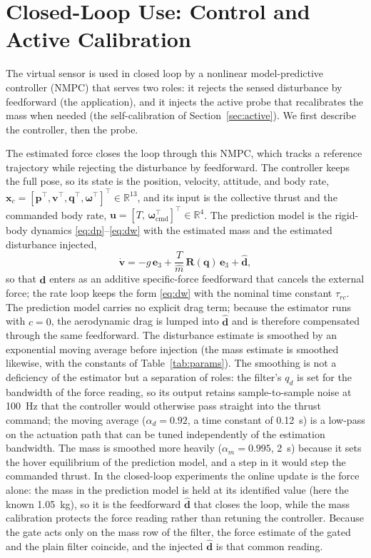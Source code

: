 \documentclass{ieeeaccess}
\newcommand{\R}{\mathbb{R}}
\newcommand{\vect}[1]{\bm{#1}}
\newcommand{\mat}[1]{\mathbf{#1}}
\begin{document}
\section{Closed-Loop Use: Control and Active Calibration}\label{sec:nmpc}

The virtual sensor is used in closed loop by a nonlinear model-predictive
controller (NMPC) that serves two roles: it rejects the sensed disturbance by
feedforward (the application), and it injects the active probe that recalibrates
the mass when needed (the self-calibration of Section~\ref{sec:active}). We first
describe the controller, then the probe.

The estimated force closes the loop through this NMPC, which
tracks a reference trajectory while rejecting the
disturbance by feedforward. The controller keeps the full pose, so its state is
the position, velocity, attitude, and body rate,
$\vect{x}_c=[\vect{p}^{\!\top},\vect{v}^{\!\top},\vect{q}^{\!\top},\vect{\omega}^{\!\top}]^{\!\top}\in\R^{13}$,
and its input is the collective thrust and the commanded body rate,
$\vect{u}=[T,\,\vect{\omega}_{\text{cmd}}^{\!\top}]^{\!\top}\in\R^{4}$. The
prediction model is the rigid-body dynamics
\eqref{eq:dp}--\eqref{eq:dw} with the estimated mass and the estimated
disturbance injected,
\begin{equation}
\dot{\vect{v}} = -g\,\vect{e}_3 + \frac{T}{\hat{m}}\,\mat{R}(\vect{q})\,\vect{e}_3
                  + \hat{\vect{d}},
\label{eq:nmpc-dyn}
\end{equation}
so that $\hat{\vect{d}}$ enters as an additive specific-force feedforward that
cancels the external force; the rate loop keeps the form \eqref{eq:dw} with the
nominal time constant $\tau_{rc}$. The prediction model carries no explicit drag term; because the
estimator runs with $c=0$, the aerodynamic drag is lumped into $\hat{\vect{d}}$
and is therefore compensated through the same feedforward. The disturbance
estimate is smoothed by an exponential moving average before injection (the mass
estimate is smoothed likewise, with the constants of Table~\ref{tab:params}).
The smoothing is not a deficiency of the estimator but a separation of roles:
the filter's $q_d$ is set for the bandwidth of the force reading, so its output
retains sample-to-sample noise at \SI{100}{\hertz} that the controller would
otherwise pass straight into the thrust command; the moving average
($\alpha_d=0.92$, a time constant of \SI{0.12}{\second}) is a low-pass on the
actuation path that can be tuned independently of the estimation bandwidth.
The mass is smoothed more heavily ($\alpha_m=0.995$, \SI{2}{\second}) because it
sets the hover equilibrium of the prediction model, and a step in it would step
the commanded thrust. In the
closed-loop experiments the online update is the force alone: the mass in the
prediction model is held at its identified value (here the known
\SI{1.05}{\kilogram}), so it is the feedforward $\hat{\vect{d}}$ that closes the
loop, while the mass calibration protects the force reading rather than
retuning the controller. Because the gate acts only on the mass row of the
filter, the force estimate of the gated and the plain filter coincide, and the
injected $\hat{\vect{d}}$ is that common reading.
\end{document}
